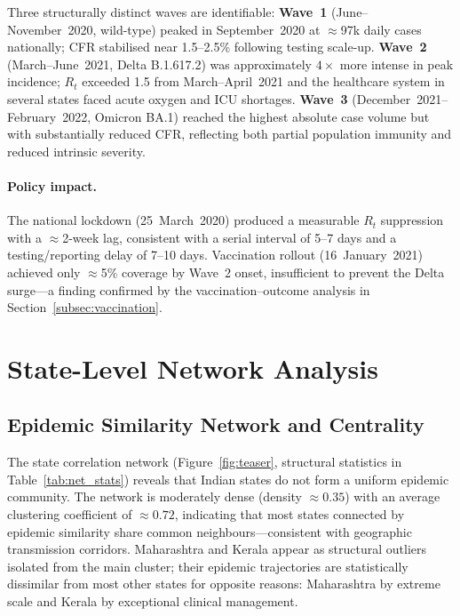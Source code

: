 \documentclass[sigconf,authordraft]{acmart}
\begin{document}
Three structurally distinct waves are identifiable:
\textbf{Wave~1} (June--November~2020, wild-type) peaked in
September~2020 at $\approx$97k daily cases nationally; CFR stabilised
near 1.5--2.5\% following testing scale-up.
\textbf{Wave~2} (March--June~2021, Delta B.1.617.2) was approximately
$4\times$ more intense in peak incidence; $R_t$ exceeded 1.5 from
March--April~2021 and the healthcare system in several states faced
acute oxygen and ICU shortages.
\textbf{Wave~3} (December~2021--February~2022, Omicron BA.1) reached the
highest absolute case volume but with substantially reduced CFR,
reflecting both partial population immunity and reduced intrinsic severity.

\paragraph{Policy impact.} The national lockdown (25~March~2020) produced
a measurable $R_t$ suppression with a $\approx$2-week lag, consistent
with a serial interval of 5--7 days and a testing/reporting delay of
7--10 days. Vaccination rollout (16~January~2021) achieved only
$\approx$5\% coverage by Wave~2 onset, insufficient to prevent the Delta
surge---a finding confirmed by the vaccination--outcome analysis in
Section~\ref{subsec:vaccination}.

\section{State-Level Network Analysis}
\label{sec:state}

\subsection{Epidemic Similarity Network and Centrality}

The state correlation network (Figure~\ref{fig:teaser}, structural
statistics in Table~\ref{tab:net_stats}) reveals that Indian states do
not form a uniform epidemic community. The network is moderately dense
(density $\approx 0.35$) with an average clustering coefficient of
$\approx 0.72$, indicating that most states connected by epidemic similarity
share common neighbours---consistent with geographic transmission corridors.
Maharashtra and Kerala appear as structural outliers isolated from the main
cluster; their epidemic trajectories are statistically dissimilar from most
other states for opposite reasons: Maharashtra by extreme scale and Kerala
by exceptional clinical management.
\end{document}
